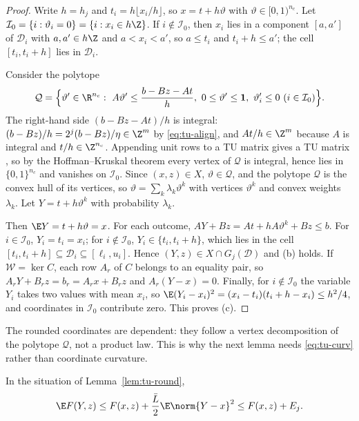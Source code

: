 \begin{proof}
Write $h=h_j$ and $t_i=h\lfloor x_i/h\rfloor$, so $x=t+h\vartheta$ with
$\vartheta\in[0,1)^{n_c}$. Let
$\mathcal I_0=\{i:\vartheta_i=0\}=\{i:x_i\in h\Z\}$. If $i\notin\mathcal I_0$,
then $x_i$ lies in a component $[a,a']$ of $\mathcal D_i$ with $a,a'\in h\Z$
and $a<x_i<a'$, so $a\le t_i$ and $t_i+h\le a'$; the cell $[t_i,t_i+h]$ lies
in $\mathcal D_i$.

Consider the polytope
\[
\mathcal Q=\Bigl\{\vartheta'\in\R^{n_c}:\ A\vartheta'\le\frac{b-Bz-At}{h},\
0\le\vartheta'\le\mathbf 1,\ \vartheta'_i\le0\ (i\in\mathcal I_0)\Bigr\}.
\]
The right-hand side $(b-Bz-At)/h$ is integral:
$(b-Bz)/h=2^j(b-Bz)/\eta\in\Z^m$ by \eqref{eq:tu-align}, and $At/h\in\Z^m$
because $A$ is integral and $t/h\in\Z^{n_c}$. Appending unit rows to a TU
matrix gives a TU matrix \cite[Section~19.1]{Schrijver1986}, so by the
Hoffman--Kruskal theorem \cite{HoffmanKruskal1956} every vertex of $\mathcal Q$
is integral, hence lies in $\{0,1\}^{n_c}$ and vanishes on $\mathcal I_0$.
Since $(x,z)\in X$, $\vartheta\in\mathcal Q$, and the polytope $\mathcal Q$ is
the convex hull of its vertices, so $\vartheta=\sum_k\lambda_k\vartheta^k$ with
vertices $\vartheta^k$ and convex weights $\lambda_k$. Let
$Y=t+h\vartheta^k$ with probability $\lambda_k$.

Then $\E Y=t+h\vartheta=x$. For each outcome,
$AY+Bz=At+hA\vartheta^k+Bz\le b$. For $i\in\mathcal I_0$, $Y_i=t_i=x_i$; for
$i\notin\mathcal I_0$, $Y_i\in\{t_i,t_i+h\}$, which lies in the cell
$[t_i,t_i+h]\subseteq\mathcal D_i\subseteq[\ell_i,u_i]$. Hence
$(Y,z)\in X\cap G_j(\mathcal D)$ and (b) holds. If $\mathcal W=\ker C$, each row
$A_r$ of $C$ belongs to an equality pair, so $A_rY+B_rz=b_r=A_rx+B_rz$ and
$A_r(Y-x)=0$. Finally, for $i\notin\mathcal I_0$ the variable $Y_i$ takes two
values with mean $x_i$, so $\E(Y_i-x_i)^2=(x_i-t_i)(t_i+h-x_i)\le h^2/4$, and
coordinates in $\mathcal I_0$ contribute zero. This proves (c).
\end{proof}

The rounded coordinates are dependent: they follow a vertex decomposition of
the polytope $\mathcal Q$, not a product law. This is why the next lemma needs
\eqref{eq:tu-curv} rather than coordinate curvature.

\begin{lemma}\label{lem:tu-allow}
In the situation of Lemma~\ref{lem:tu-round},
\[
\E F(Y,z)\le F(x,z)+\frac{\bar L}2\E\norm{Y-x}^2\le F(x,z)+E_j .
\]
\end{lemma}

